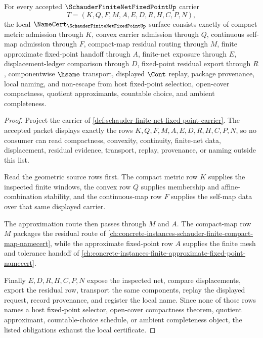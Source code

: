 \begin{theorem}
\label{thm:schauder-finite-net-fixed-point-namecert-obligations}
For every accepted $\SchauderFiniteNetFixedPointUp$ carrier
$$
T=(K,Q,F,M,A,E,D,R,H,C,P,N),
$$
the local $\NameCert_{\SchauderFiniteNetFixedPointUp}$ surface consists exactly of compact metric admission through $K$, convex carrier admission through $Q$, continuous self-map admission through $F$, compact-map residual routing through $M$, finite approximate fixed-point handoff through $A$, finite-net exposure through $E$, displacement-ledger comparison through $D$, fixed-point residual export through $R$, componentwise $\hsame$ transport, displayed $\Cont$ replay, package provenance, local naming, and non-escape from host fixed-point selection, open-cover compactness, quotient approximants, countable choice, and ambient completeness.
\end{theorem}
\begin{proof}
Project the carrier of \autoref{def:schauder-finite-net-fixed-point-carrier}. The accepted packet displays exactly the rows $K,Q,F,M,A,E,D,R,H,C,P,N$, so no consumer can read compactness, convexity, continuity, finite-net data, displacement, residual evidence, transport, replay, provenance, or naming outside this list.

Read the geometric source rows first. The compact metric row $K$ supplies the inspected finite windows, the convex row $Q$ supplies membership and affine-combination stability, and the continuous-map row $F$ supplies the self-map data over that same displayed carrier.

The approximation route then passes through $M$ and $A$. The compact-map row $M$ packages the residual route of \autoref{ch:concrete-instances-schauder-finite-compact-map-namecert}, while the approximate fixed-point row $A$ supplies the finite mesh and tolerance handoff of \autoref{ch:concrete-instances-finite-approximate-fixed-point-namecert}.

Finally $E,D,R,H,C,P,N$ expose the inspected net, compare displacements, export the residual row, transport the same components, replay the displayed request, record provenance, and register the local name. Since none of those rows names a host fixed-point selector, open-cover compactness theorem, quotient approximant, countable-choice schedule, or ambient completeness object, the listed obligations exhaust the local certificate.
\end{proof}

